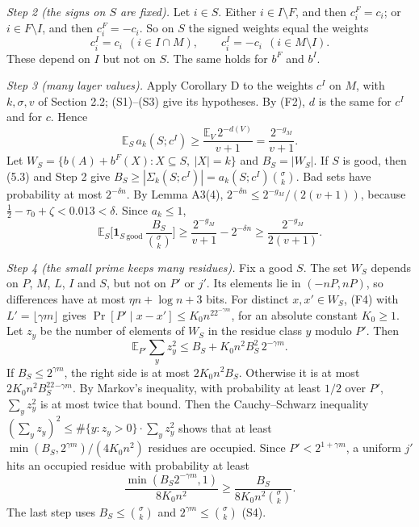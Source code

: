 \documentclass[10pt,a4paper]{article}
\begin{document}
\emph{Step 2 (the signs on $S$ are fixed).} Let $i \in S$. Either $i \in I\setminus F$, and then $c^F_i = c_i$; or
$i \in F\setminus I$, and then $c^F_i = -c_i$. So on $S$ the signed weights equal the weights
\[c^I_i = c_i\ \ (i \in I\cap M),\qquad c^I_i = -c_i\ \ (i \in M\setminus I).\]
These depend on $I$ but not on $S$. The same holds for $b^F$ and $b^I$.

\emph{Step 3 (many layer values).} Apply Corollary D to the weights $c^I$ on $M$, with $k, \sigma, v$ of Section 2.2;
(S1)--(S3) give its hypotheses. By (F2), $d$ is the same for $c^I$ and for $c$. Hence
\[\mathbb E_S\, a_k(S; c^I) \ge \frac{\mathbb E_V\,2^{-d(V)}}{v+1} = \frac{2^{-g_M}}{v+1}.\]
Let $W_S = \{b(A) + b^F(X) : X \subseteq S,\ |X| = k\}$ and $B_S = |W_S|$. If $S$ is good, then (5.3) and Step 2 give
$B_S \ge |\Sigma_k(S; c^I)| = a_k(S; c^I)\binom\sigma k$. Bad sets have probability at most $2^{-\delta n}$. By Lemma
A3(4), $2^{-\delta n} \le 2^{-g_M}/(2(v+1))$, because $\tfrac12 - \tau_0 + \zeta < 0.013 < \delta$. Since $a_k \le 1$,
\[\mathbb E_S\Big[\mathbf 1_{S\ \text{good}}\,\frac{B_S}{\binom\sigma k}\Big] \ge \frac{2^{-g_M}}{v+1} - 2^{-\delta n} \ge \frac{2^{-g_M}}{2(v+1)}.\]

\emph{Step 4 (the small prime keeps many residues).} Fix a good $S$. The set $W_S$ depends on $P$, $M$, $L$, $I$ and $S$, but
not on $P'$ or $j'$. Its elements lie in $(-nP, nP)$, so differences have at most $\eta n + \log n + 3$ bits. For
distinct $x, x' \in W_S$, (F4) with $L' = \lfloor\gamma m\rfloor$ gives $\Pr[P' \mid x - x'] \le K_0n^22^{-\gamma m}$, for
an absolute constant $K_0 \ge 1$. Let $z_y$ be the number of elements of $W_S$ in the residue class $y$ modulo $P'$. Then
\[\mathbb E_{P'}\sum_y z_y^2 \le B_S + K_0n^2B_S^2\,2^{-\gamma m}.\]
If $B_S \le 2^{\gamma m}$, the right side is at most $2K_0n^2B_S$. Otherwise it is at most $2K_0n^2B_S^22^{-\gamma m}$.
By Markov's inequality, with probability at least $1/2$ over $P'$, $\sum_yz_y^2$ is at most twice that bound. Then
the Cauchy--Schwarz inequality $(\sum_yz_y)^2 \le \#\{y : z_y > 0\}\cdot\sum_yz_y^2$ shows that at least
$\min(B_S, 2^{\gamma m})/(4K_0n^2)$ residues are occupied. Since $P' < 2^{1+\gamma m}$, a uniform $j'$ hits an occupied
residue with probability at least
\[\frac{\min(B_S2^{-\gamma m}, 1)}{8K_0n^2} \ge \frac{B_S}{8K_0n^2\binom\sigma k}.\]
The last step uses $B_S \le \binom\sigma k$ and $2^{\gamma m} \le \binom\sigma k$ (S4).
\end{document}
